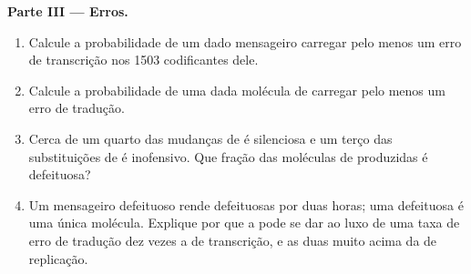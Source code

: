 \begin{problem}
\medskip
\noindent\textbf{Parte III --- Erros.}
\begin{enumerate}[resume]
  \item Calcule a probabilidade de um dado mensageiro carregar pelo
        menos um erro de transcrição nos \qty{1503}{} 
        codificantes dele.
  \item Calcule a probabilidade de uma dada molécula de 
        carregar pelo menos um erro de tradução.
  \item Cerca de um quarto das mudanças de  é silenciosa e um
        terço das substituições de  é inofensivo. Que fração
        das moléculas de  produzidas é defeituosa?
  \item Um mensageiro defeituoso rende  defeituosas por duas
        horas; uma  defeituosa é uma única molécula. Explique
        por que a  pode se dar ao luxo de uma taxa de erro de
        tradução dez vezes a de transcrição, e as duas muito acima da de
        replicação.
\end{enumerate}


\end{problem}
